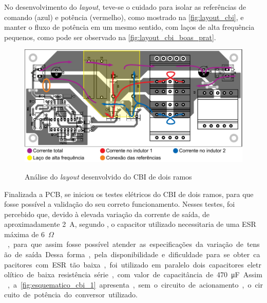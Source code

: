    No desenvolvimento do \textit{layout}, teve-se o cuidado para isolar as referências de comando (azul) e potência (vermelho), como mostrado na \autoref{fig:layout_cbi}, e manter o fluxo de potência em um mesmo sentido, com laços de alta frequência pequenos, como pode ser observado na \autoref{fig:layout_cbi_boas_prat}.
    
    \begin{figure}[H]
    	\centering
    	\caption{Análise do \textit{layout} desenvolvido do CBI de dois ramos}
    	\includegraphics[scale=1]{pdf/layout/layout_CBI3.pdf}
        \label{fig:layout_cbi_boas_prat}
    \end{figure}
    
    Finalizada a PCB, se iniciou os testes elétricos do CBI de dois ramos, para que fosse possível a validação do seu correto funcionamento. Nesses testes, foi percebido que, devido à elevada variação da corrente de saída, de aproximadamente \SI{2}{\ampere}, segundo , o capacitor utilizado necessitaria de uma ESR máxima de \SI{6}{\milli$\Omega$}, para que assim fosse possível atender as especificações da variação de tensão de saída. Dessa forma, pela disponibilidade e dificuldade para se obter capacitores com ESR tão baixa, foi utilizado em paralelo dois capacitores eletrolítico de baixa resistência série, com valor de capacitância de \SI{470}{\micro\farad}. Assim, a \autoref{fig:esquematico_cbi_1} apresenta, sem o circuito de acionamento, o circuito de potência do conversor utilizado. 
    
